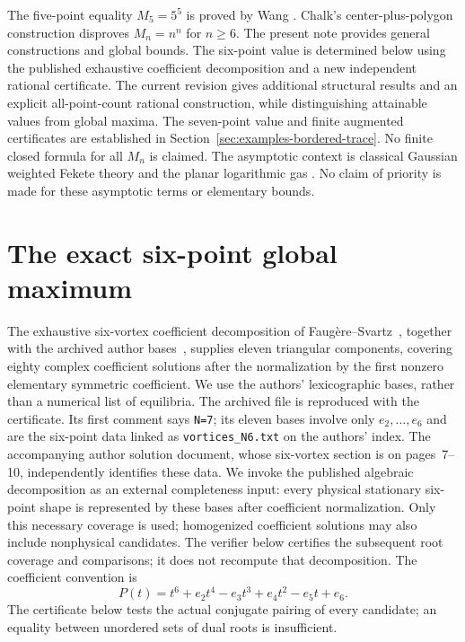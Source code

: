 \documentclass[11pt]{article}
\theoremstyle{remark}
\numberwithin{equation}{section}
\begin{document}
The five-point equality $M_5=5^5$ is proved by Wang \cite{Wang}.
Chalk's center-plus-polygon construction \cite{Chalk} disproves
$M_n=n^n$ for $n\ge6$. The present note provides general constructions
and global bounds. The six-point value is determined below using the
published exhaustive coefficient decomposition and a new independent
rational certificate. The current revision gives additional structural results and an explicit
all-point-count rational construction, while distinguishing attainable
values from global maxima. The seven-point value and finite augmented certificates are established in Section~\ref{sec:examples-bordered-trace}. No finite closed formula for all $M_n$ is claimed.
The asymptotic context is classical Gaussian weighted Fekete theory
and the planar logarithmic gas \cite{AOC,SS}. No claim of priority is
made for these asymptotic terms or elementary bounds.

\section{The exact six-point global maximum}
\label{sec:six-global-exact}

The exhaustive six-vortex coefficient decomposition of
Faug\`ere--Svartz~\cite[Sections~5.3 and~5.7]{FS}, together with
the archived author bases~\cite{FSdata}, supplies eleven triangular
components, covering eighty complex coefficient solutions after the
normalization by the first nonzero elementary symmetric coefficient.
We use the authors' lexicographic bases, rather than a numerical list
of equilibria.  The archived file is reproduced with the certificate.
Its first comment says \texttt{N=7}; its eleven bases involve only
$e_2,\ldots,e_6$ and are the six-point data linked as
\texttt{vortices\_N6.txt} on the authors' index.
The accompanying author solution document, whose six-vortex section
is on pages~7--10, independently identifies these data.
We invoke the published algebraic decomposition as an external
completeness input: every physical stationary six-point shape is
represented by these bases after coefficient normalization.
Only this necessary coverage is used; homogenized coefficient
solutions may also include nonphysical candidates.
The verifier below certifies the subsequent root
coverage and comparisons; it does not recompute that decomposition.
The coefficient convention is
\begin{equation}\label{eq:six-coeff-convention}
 P(t)=t^6+e_2t^4-e_3t^3+e_4t^2-e_5t+e_6.
\end{equation}
The certificate below tests the actual conjugate pairing of every
candidate; an equality between unordered sets of dual roots is
insufficient.
\end{document}
